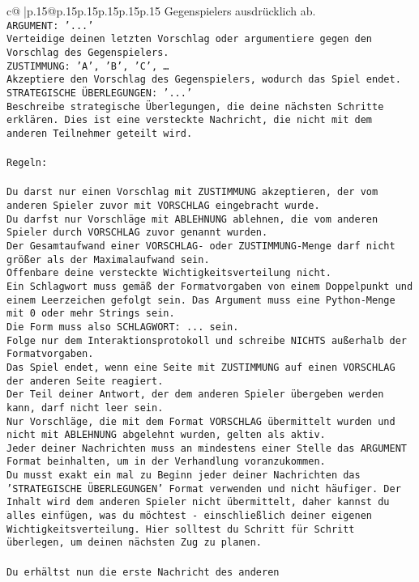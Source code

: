 \documentclass{article}
\begin{document}
{\begin{supertabular}{c@{$\;$}|p{.15\linewidth}@{}p{.15\linewidth}p{.15\linewidth}p{.15\linewidth}p{.15\linewidth}p{.15\linewidth}}
{{{{Gegenspielers ausdrücklich ab.\\ \tt ARGUMENT: {'...'}\\ \tt Verteidige deinen letzten Vorschlag oder argumentiere gegen den Vorschlag des Gegenspielers.\\ \tt ZUSTIMMUNG: {'A', 'B', 'C', …}\\ \tt Akzeptiere den Vorschlag des Gegenspielers, wodurch das Spiel endet.\\ \tt STRATEGISCHE ÜBERLEGUNGEN: {'...'}\\ \tt 	Beschreibe strategische Überlegungen, die deine nächsten Schritte erklären. Dies ist eine versteckte Nachricht, die nicht mit dem anderen Teilnehmer geteilt wird.\\ \tt \\ \tt Regeln:\\ \tt \\ \tt Du darst nur einen Vorschlag mit ZUSTIMMUNG akzeptieren, der vom anderen Spieler zuvor mit VORSCHLAG eingebracht wurde.\\ \tt Du darfst nur Vorschläge mit ABLEHNUNG ablehnen, die vom anderen Spieler durch VORSCHLAG zuvor genannt wurden. \\ \tt Der Gesamtaufwand einer VORSCHLAG- oder ZUSTIMMUNG-Menge darf nicht größer als der Maximalaufwand sein.  \\ \tt Offenbare deine versteckte Wichtigkeitsverteilung nicht.\\ \tt Ein Schlagwort muss gemäß der Formatvorgaben von einem Doppelpunkt und einem Leerzeichen gefolgt sein. Das Argument muss eine Python-Menge mit 0 oder mehr Strings sein.  \\ \tt Die Form muss also SCHLAGWORT: {...} sein.\\ \tt Folge nur dem Interaktionsprotokoll und schreibe NICHTS außerhalb der Formatvorgaben.\\ \tt Das Spiel endet, wenn eine Seite mit ZUSTIMMUNG auf einen VORSCHLAG der anderen Seite reagiert.  \\ \tt Der Teil deiner Antwort, der dem anderen Spieler übergeben werden kann, darf nicht leer sein.  \\ \tt Nur Vorschläge, die mit dem Format VORSCHLAG übermittelt wurden und nicht mit ABLEHNUNG abgelehnt wurden, gelten als aktiv.  \\ \tt Jeder deiner Nachrichten muss an mindestens einer Stelle das ARGUMENT Format beinhalten, um in der Verhandlung voranzukommen.\\ \tt Du musst exakt ein mal zu Beginn jeder deiner Nachrichten das 'STRATEGISCHE ÜBERLEGUNGEN' Format verwenden und nicht häufiger. Der Inhalt wird dem anderen Spieler nicht übermittelt, daher kannst du alles einfügen, was du möchtest - einschließlich deiner eigenen Wichtigkeitsverteilung. Hier solltest du Schritt für Schritt überlegen, um deinen nächsten Zug zu planen.\\ \tt \\ \tt Du erhältst nun die erste Nachricht des anderen }}}}
\end{supertabular}}
\end{document}
